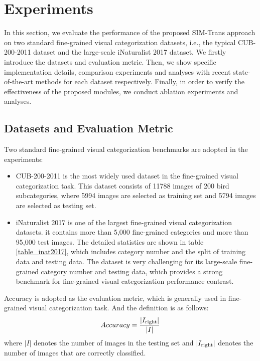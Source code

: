 \documentclass[sigconf, nonacm]{acmart}
\begin{document}
\section{Experiments} \label{exper}






In this section, we evaluate the performance of the proposed SIM-Trans approach on two standard fine-grained visual categorization datasets, i.e., the typical CUB-200-2011 \cite{cub200} dataset and the large-scale iNaturalist 2017 \cite{van2018inaturalist} dataset. We firstly introduce the datasets and evaluation metric. Then, we show specific implementation details, comparison experiments and analyses with recent state-of-the-art methods for each dataset respectively. Finally, in order to verify the effectiveness of the proposed modules, we conduct ablation experiments and analyses.



\subsection{Datasets and Evaluation Metric}
\label{Datasets and Evaluation Metric}




Two standard fine-grained visual categorization benchmarks are adopted in the experiments: 
\begin{itemize}[leftmargin=30pt]
\item {CUB-200-2011 \cite{cub200} is the most widely used dataset in the fine-grained visual categorization task. This dataset consists of 11788 images of 200 bird subcategories, where 5994 images are selected as training set and 5794 images are selected as testing set.} 
\item {iNaturalist 2017 \cite{van2018inaturalist} is one of the largest fine-grained visual categorization datasets. it contains more than 5,000 fine-grained categories and more than 95,000 test images. The detailed statistics are shown in table \ref{table_inat2017}, which includes category number and the split of training data and testing data. The dataset is very challenging for its large-scale fine-grained category number and testing data, which provides a strong benchmark for fine-grained visual categorization performance contrast.
}
\end{itemize}




Accuracy is adopted as the evaluation metric, which is generally used in fine-grained visual categorization task. And the definition is as follows:
\begin{equation}
Accuracy = \frac{{|{I_{{\rm{right}}}}|}}{{|I|}}
\end{equation}
where $|I|$ denotes the number of images in the testing set and $|{I_{{\rm{right}}}}|$ denotes the number of images that are correctly classified.
\end{document}
